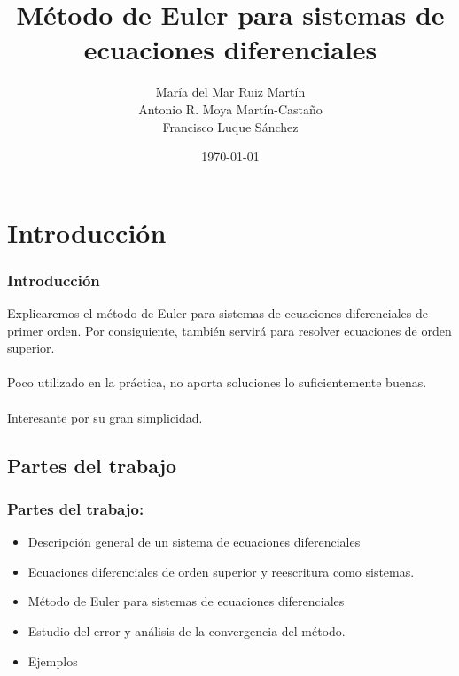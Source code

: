 \documentclass{beamer}
\title[Método de Euler para sist. de ecuaciones]{Método de Euler para sistemas de ecuaciones diferenciales} %
\author{María del Mar Ruiz Martín\\
        Antonio R. Moya Martín-Castaño\\
        Francisco Luque Sánchez} %
\institute[UGR] %
{
  Universidad de Granada \\ %
}
\date{\today} %
\begin{document}
\begin{frame}
\titlepage 
\end{frame}


\section{Introducción}
\begin{frame}
  \frametitle{Introducción}
  Explicaremos el método de Euler para sistemas de ecuaciones diferenciales de primer orden. Por consiguiente, también servirá para resolver ecuaciones de orden superior.\\~\\
  
  Poco utilizado en la práctica, no aporta soluciones lo suficientemente buenas.\\~\\

  Interesante por su gran simplicidad.
  
\end{frame}


\subsection{Partes del trabajo}
\begin{frame}
	\frametitle{Partes del trabajo:}
	\begin{itemize}
		\item Descripción general de un sistema de ecuaciones diferenciales
		\item Ecuaciones diferenciales de orden superior y reescritura como sistemas.
		\item Método de Euler para sistemas de ecuaciones diferenciales
		\item Estudio del error y análisis de la convergencia del método.
		\item Ejemplos
		
	\end{itemize}
\end{frame}
\end{document}
